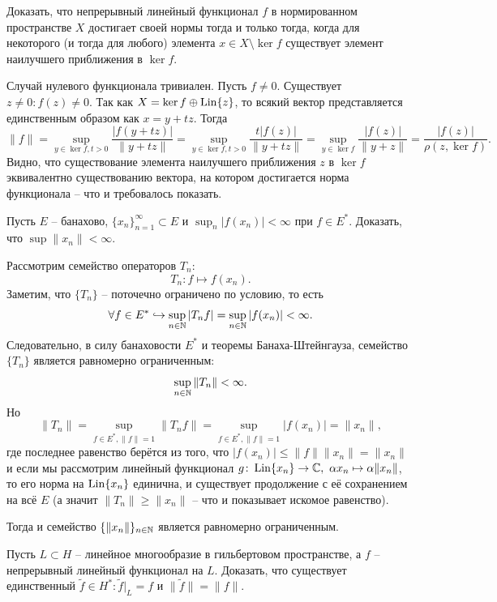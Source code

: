 \begin{task}[9.5]
    Доказать, что непрерывный линейный функционал $f$ в нормированном пространстве $X$ достигает своей нормы тогда и только тогда, когда для некоторого (и тогда для любого) элемента $x \in X \setminus \ker f$ существует элемент наилучшего приближения в $\ker f$.
\end{task}
\begin{solution}
    Случай нулевого функционала тривиален.
    Пусть $f \neq 0$.
    Существует $z\neq 0\colon f(z) \neq 0$.
    Так как $X = \ker f \oplus \operatorname{Lin}\{z\}$, то всякий вектор представляется единственным образом как $x = y + tz$.
    Тогда
    \[
        \|f\| = \sup_{y \in \ker f, t > 0} \frac{|f(y + tz)|}{\|y + tz\|} = \sup_{y \in \ker f, t > 0} \frac{t|f(z)|}{\|y + tz\|} = \sup_{y \in \ker f} \frac{|f(z)|}{\|y + z\|} = \frac{|f(z)|}{\rho(z, \ker f)}.
    \]
    Видно, что существование элемента наилучшего приближения $z$ в $\ker f$ эквивалентно существованию вектора, на котором достигается норма функционала -- что и требовалось показать.
\end{solution}
\begin{task}[9.7]
    Пусть $E$ -- банахово, $\{x_n\}_{n = 1}^{\infty} \subset E$ и $\sup_{n} |f(x_n)| < \infty$ при $f \in E^*$.
    Доказать, что $\sup \|x_n\| < \infty$.
\end{task}
\begin{solution}
    Рассмотрим семейство операторов $T_n\colon$
    \[
        T_n \colon f \mapsto f(x_n).
    \]
    Заметим, что $\{T_n\}$ -- поточечно ограничено по условию, то есть
    \[
        \forall f \in E^* \hookrightarrow \sup_{n \in \mathbb{N}} |T_n f| = \sup_{n \in \mathbb{N}} |f(x_n)| < \infty.
    \]
    Следовательно, в силу банаховости $E^*$ и теоремы Банаха-Штейнгауза, семейство $\{T_n\}$ является равномерно ограниченным:
    \[
        \sup_{n \in \mathbb{N}} \|T_n \| < \infty.
    \]
    Но
    \[
        \|T_n\| = \sup_{f \in E^*, \|f\| = 1} \|T_n f \| = \sup_{f \in E^*, \|f\| = 1} |f(x_n)| = \|x_n\|,
    \]
    где последнее равенство берётся из того, что $|f(x_n)| \leq \|f\|\|x_n\| = \|x_n\|$ и если мы рассмотрим линейный функционал $g\colon \operatorname{Lin}\{x_n\} \to \mathbb{C}, \  \alpha x_n \mapsto \alpha \|x_n\|$, то его норма на $\operatorname{Lin}\{x_n\}$ единична, и существует продолжение с её сохранением на всё $E$ (а значит $\|T_n\| \geq \|x_n\|$ -- что и показывает искомое равенство).

    Тогда и семейство $\{\|x_n\|\}_{n \in \mathbb{N}}$ является равномерно ограниченным.
\end{solution}
\begin{task}[9.9]
    Пусть $L \subset H$ -- линейное многообразие в гильбертовом пространстве, а $f$ -- непрерывный линейный функционал на $L$.
    Доказать, что существует единственный $\tilde{f} \in H^*\colon \tilde{f}|_{L} = f$ и $\|\tilde{f}\| = \|f\|$.
\end{task}
